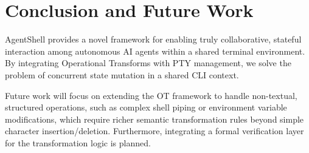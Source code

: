 \documentclass[11pt,a4paper]{article}
\begin{document}
\section{Conclusion and Future Work}
AgentShell provides a novel framework for enabling truly collaborative, stateful interaction among autonomous AI agents within a shared terminal environment. By integrating Operational Transforms with PTY management, we solve the problem of concurrent state mutation in a shared CLI context.

Future work will focus on extending the OT framework to handle non-textual, structured operations, such as complex shell piping or environment variable modifications, which require richer semantic transformation rules beyond simple character insertion/deletion. Furthermore, integrating a formal verification layer for the transformation logic is planned.



\end{document}
